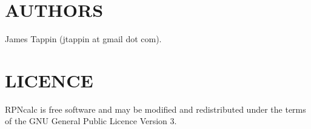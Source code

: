 \documentclass{article}
\begin{document}
\section{AUTHORS}

James Tappin (jtappin at gmail dot com).

\section{LICENCE}

RPNcalc is free software and may be modified and redistributed under
the terms of the GNU General Public Licence Version 3.

\LatexManEnd
\end{document}

